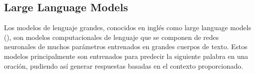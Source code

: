 \subsection{Large Language Models}
Los modelos de lenguaje grandes, conocidos en inglés como large language models (), son modelos computacionales de lenguaje que se componen de redes neuronales de muchos parámetros entrenados en grandes cuerpos de texto. Estos modelos principalmente son entrenados para predecir la siguiente palabra en una oración, pudiendo así generar respuestas basadas en el contexto proporcionado.